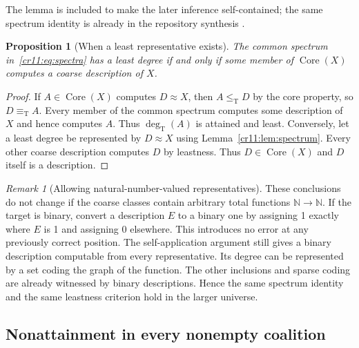 \documentclass[11pt,letterpaper]{article}
\theoremstyle{plain}
\newtheorem{proposition}[theorem]{Proposition}
\theoremstyle{definition}
\theoremstyle{remark}
\newtheorem{remark}[theorem]{Remark}
\numberwithin{equation}{section}
\newcommand{\N}{\mathbb N}
\newcommand{\leT}{\leq_{\mathrm T}}
\newcommand{\eqT}{\equiv_{\mathrm T}}
\newcommand{\Core}{\operatorname{Core}}
\newcommand{\degT}{\deg_{\mathrm T}}
\begin{document}
The lemma is included to make the later inference self-contained; the
same spectrum identity is already in the repository synthesis
\cite{RepoSynthesis}.

\begin{proposition}[When a least representative exists]\label{cr11:prop:least}
The common spectrum in~\eqref{cr11:eq:spectra} has a least degree if and only if
some member of $\Core(X)$ computes a coarse description of $X$.
\end{proposition}
\begin{proof}
If $A\in\Core(X)$ computes $D\approx X$, then $A\leT D$ by the core
property, so $D\eqT A$. Every member of the common spectrum computes some
description of $X$ and hence computes $A$. Thus $\degT(A)$ is attained and
least. Conversely, let a least degree be represented by $D\approx X$ using
Lemma~\ref{cr11:lem:spectrum}. Every other coarse description computes $D$ by
leastness. Thus $D\in\Core(X)$ and $D$ itself is a description.
\end{proof}

\begin{remark}[Allowing natural-number-valued representatives]
These conclusions do not change if the coarse classes contain arbitrary
total functions $\N\to\N$. If the target is binary, convert a description
$E$ to a binary one by assigning 1 exactly where $E$ is 1 and assigning 0
elsewhere. This introduces no error at any previously correct position.
The self-application argument still gives a binary description computable
from every representative. Its degree can be represented by a set coding
the graph of the function. The other inclusions and sparse coding are
already witnessed by binary descriptions. Hence the same spectrum identity
and the same leastness criterion hold in the larger universe.
\end{remark}

\subsection{Nonattainment in every nonempty coalition}\label{cr11:sec:nonattain}
\end{document}
